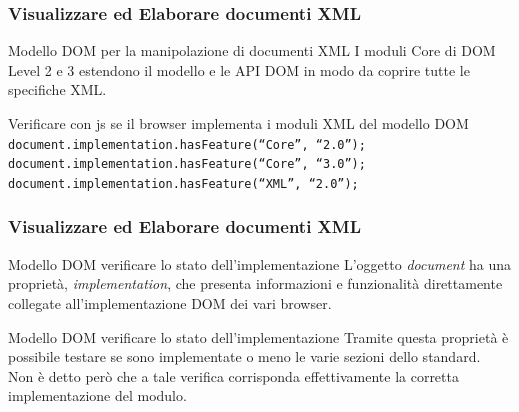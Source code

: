 \begin{frame}
    \frametitle{Visualizzare ed Elaborare documenti XML}
    \addtocounter{nframe}{1}
   
     \begin{block}{Modello DOM per la manipolazione di documenti XML}
        I moduli Core di DOM Level 2 e 3 estendono il modello e le API DOM in modo da coprire tutte le specifiche XML.
     \end{block}

     \begin{block}{Verificare con js se il browser implementa i moduli XML del modello DOM}
        \texttt{document.implementation.hasFeature(“Core”, “2.0”); }
        \\\texttt{document.implementation.hasFeature(“Core”, “3.0”);} 
        \\\texttt{document.implementation.hasFeature(“XML”, “2.0”);}
     \end{block}
     
\end{frame}

\begin{frame}
    \frametitle{Visualizzare ed Elaborare documenti XML}
    \addtocounter{nframe}{1}
    

     \begin{block}{Modello DOM verificare lo stato dell'implementazione}
        L'oggetto \textit{document} ha una proprietà, \textit{implementation}, che presenta informazioni e funzionalità direttamente collegate all'implementazione DOM dei vari browser.
     \end{block}

     \begin{block}{Modello DOM verificare lo stato dell'implementazione}
        Tramite questa proprietà è possibile testare se sono implementate o meno le varie sezioni dello standard. 
        \\ Non è detto però che a tale verifica corrisponda effettivamente la corretta implementazione del modulo.
     \end{block}
     
\end{frame}


